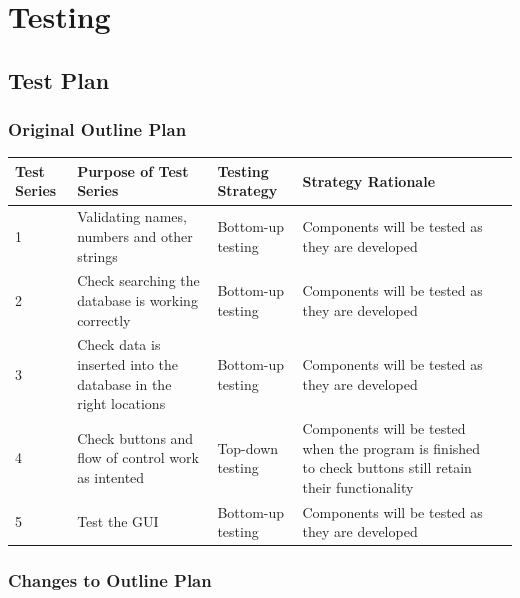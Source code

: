 \chapter{Testing}

\label{testing_section}

\section{Test Plan}

\begin{landscape}
\subsection{Original Outline Plan}

\begin{center}
	\begin{longtable}{|p{2cm}|p{3cm}|p{3cm}|p{3cm}|l}
		\hline
		\textbf{Test Series}   & \textbf{Purpose of Test Series}   & \textbf{Testing Strategy}   & \textbf{Strategy Rationale} \\ \hline
		1  & Validating names, numbers and other strings  & Bottom-up testing  & Components will be tested as they are developed \\ \hline
		2  & Check searching the database is working correctly & Bottom-up testing  & Components will be tested as they are developed \\ \hline
		3  & Check data is inserted into the database in the right locations & Bottom-up testing  & Components will be tested as they are developed \\ \hline
		4  & Check buttons and flow of control work as intented & Top-down testing  & Components will be tested when the program is finished to check buttons still retain their functionality \\ \hline
		5  & Test the GUI & Bottom-up testing  & Components will be tested as they are developed \\ \hline
	\end{longtable}
\end{center}

\subsection{Changes to Outline Plan}


\end{landscape}
